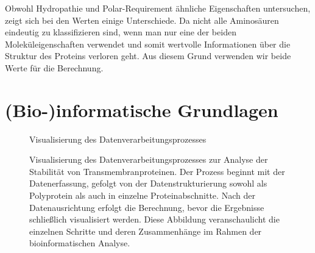 \documentclass[german,version-2022-01]{uzl-thesis}
\begin{document}
Obwohl Hydropathie und Polar-Requirement \"ahnliche Eigenschaften untersuchen, zeigt sich bei den Werten einige Unterschiede. Da nicht alle Aminos\"auren eindeutig zu klassifizieren sind, wenn man nur eine der beiden Molek\"uleigenschaften verwendet und somit wertvolle Informationen \"uber die Struktur des Proteins verloren geht. Aus diesem Grund verwenden wir beide Werte f\"ur die Berechnung. 

\section{(Bio-)informatische Grundlagen}
\begin{figure}[tbp]
    \centering
    \caption{Visualisierung des Datenverarbeitungsprozesses}
    \caption{Visualisierung des Datenverarbeitungsprozesses zur Analyse der Stabilit\"at von Transmembranproteinen. Der Prozess beginnt mit der Datenerfassung, gefolgt von der Datenstrukturierung sowohl als Polyprotein als auch in einzelne Proteinabschnitte. Nach der Datenausrichtung erfolgt die Berechnung, bevor die Ergebnisse schlie\ss{}lich visualisiert werden. Diese Abbildung veranschaulicht die einzelnen Schritte und deren Zusammenh\"ange im Rahmen der bioinformatischen Analyse.}
    \label{fig:datenverarbeitung}
\end{figure} 
\end{document}

